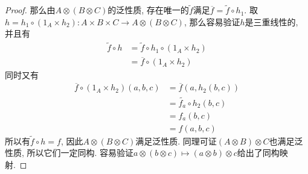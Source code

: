 \begin{proof}
    那么由$A\otimes(B\otimes C)$的泛性质, 存在唯一的$\widetilde{f}$满足$\overline{f}=\widetilde{f}\circ h_1$.
    取$h=h_1\circ(1_A\times h_2):A\times B\times C\to A\otimes(B\otimes C)$, 那么容易验证$h$是三重线性的, 并且有
    \begin{align*}
        \widetilde{f}\circ h&=\widetilde{f}\circ h_1\circ(1_A\times h_2)\\
        &=\overline{f}\circ(1_A\times h_2)
    \end{align*}
    同时又有
    \begin{align*}
        \overline{f}\circ(1_A\times h_2)(a,b,c)&=\overline{f}(a,h_2(b,c))\\
        &=\widetilde{f_a}\circ h_2(b,c)\\
        &=f_a(b,c)\\
        &=f(a,b,c)
    \end{align*}
    所以有$\widetilde{f}\circ h=f$, 因此$A\otimes(B\otimes C)$满足泛性质.
    同理可证$(A\otimes B)\otimes C$也满足泛性质, 所以它们一定同构.
    容易验证$a\otimes(b\otimes c)\mapsto (a\otimes b)\otimes c$给出了同构映射.
\end{proof}

